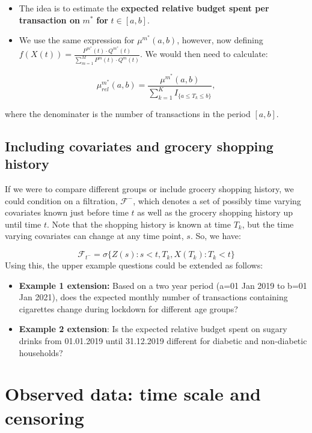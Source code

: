 \documentclass[
  11pt,
]{article}
\providecommand{\tightlist}{%
  \setlength{\itemsep}{0pt}\setlength{\parskip}{0pt}}
\begin{document}
\begin{itemize}
\tightlist
\item
  The idea is to estimate the \textbf{expected relative budget spent per
  transaction on} \(m^*\) \textbf{for} \(t\in[a,b]\).
\item
  We use the same expression for \(\mu^{m^*}(a,b)\), however, now
  defining
  \(f(X(t)) = \frac{P^{m^*}(t) \cdot Q^{m^*}(t)}{\sum_{m=1}^M P^m(t) \cdot Q^m(t)}\).
  We would then need to calculate:
\end{itemize}

\[
\mu_{rel}^{m^*}(a,b)= \frac{\mu^{m^*}(a, b)}{\sum_{k=1}^K I_{\{a \leq T_k \leq b \}}},
\]

where the denominater is the number of transactions in the period
\([a,b]\).

\hypertarget{including-covariates-and-grocery-shopping-history}{%
\subsection{Including covariates and grocery shopping
history}\label{including-covariates-and-grocery-shopping-history}}

If we were to compare different groups or include grocery shopping
history, we could condition on a filtration, \(\mathcal{F}^-\), which
denotes a set of possibly time varying covariates known just before time
\(t\) as well as the grocery shopping history up until time \(t\). Note
that the shopping history is known at time \(T_k\), but the time varying
covariates can change at any time point, \(s\). So, we have:

\[
\mathcal{F}_{t^-} = \sigma\{Z(s): s < t, T_k, X(T_k): T_k < t\}
\] Using this, the upper example questions could be extended as follows:

\begin{itemize}
\tightlist
\item
  \textbf{Example 1 extension:} Based on a two year period (a=01 Jan
  2019 to b=01 Jan 2021), does the expected monthly number of
  transactions containing cigarettes change during lockdown for
  different age groups?
\item
  \textbf{Example 2 extension}: Is the expected relative budget spent on
  sugary drinks from 01.01.2019 until 31.12.2019 different for diabetic
  and non-diabetic households?
\end{itemize}

\hypertarget{observed-data-time-scale-and-censoring}{%
\section{Observed data: time scale and
censoring}\label{observed-data-time-scale-and-censoring}}
\end{document}
